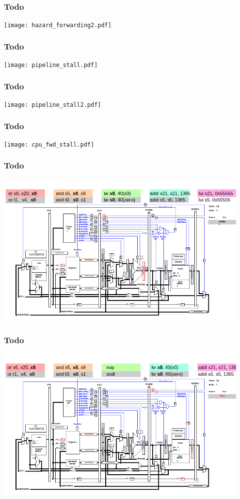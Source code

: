 \documentclass{beamer}
\begin{document}
\begin{frame}
\frametitle{Todo}
\texttt{[image: hazard\_forwarding2.pdf]}
\end{frame}

\begin{frame}
\frametitle{Todo}
\texttt{[image: pipeline\_stall.pdf]}
\end{frame}

\begin{frame}
\frametitle{Todo}
\texttt{[image: pipeline\_stall2.pdf]}
\end{frame}

\begin{frame}
\frametitle{Todo}
\texttt{[image: cpu\_fwd\_stall.pdf]}
\end{frame}

\begin{frame}
\frametitle{Todo}
\includegraphics[width=0.95\textwidth]{fig/hazard-stall-qtrvsim2.png}
\end{frame}

\begin{frame}
\frametitle{Todo}
\includegraphics[width=0.95\textwidth]{fig/hazard-stall-qtrvsim3.png}
\end{frame}
\end{document}
